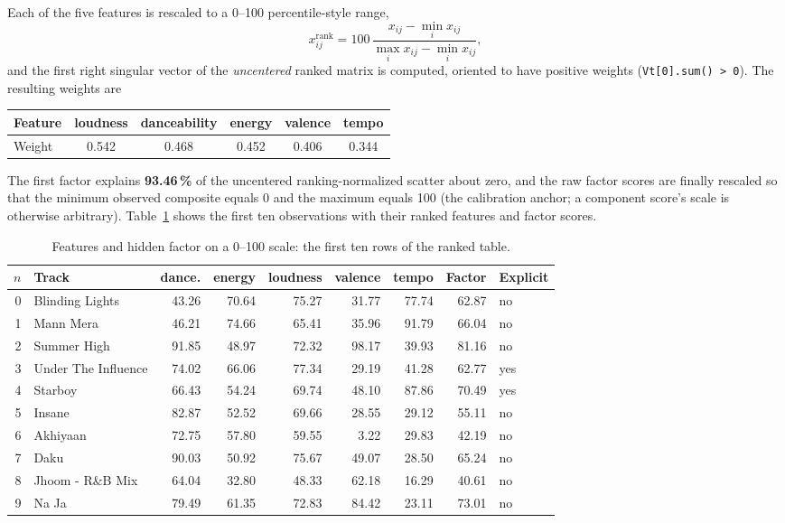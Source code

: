 \documentclass[11pt,letterpaper]{article}
\begin{document}
Each of the five features is rescaled to a 0--100 percentile-style range,
\begin{equation*}
  x^{\mathrm{rank}}_{ij}
  = 100\,\frac{x_{ij}-\min_i x_{ij}}{\max_i x_{ij}-\min_i x_{ij}},
\end{equation*}
and the first right singular vector of the \emph{uncentered} ranked
matrix is computed, oriented to have positive weights (\texttt{Vt[0].sum() >
0}). The resulting weights are
\begin{center}
\small
\begin{tabular}{lccccc}
\toprule
Feature & loudness & danceability & energy & valence & tempo \\
\midrule
Weight & 0.542 & 0.468 & 0.452 & 0.406 & 0.344 \\
\bottomrule
\end{tabular}
\end{center}
The first factor explains \textbf{93.46\,\%} of the uncentered
ranking-normalized scatter about zero, and the raw factor scores are finally
rescaled so that the minimum observed composite equals 0 and the maximum
equals 100 (the calibration anchor; a component score's scale is otherwise
arbitrary). Table~\ref{tab:a2ranktop} shows the first ten observations with
their ranked features and factor scores.

\begin{table}[H]
\centering
\caption{Features and hidden factor on a 0--100 scale: the first ten rows of
the ranked table.}
\label{tab:a2ranktop}
\footnotesize
\setlength{\tabcolsep}{4.5pt}
\begin{tabular}{rlrrrrrrl}
\toprule
$n$ & Track & dance. & energy & loudness & valence & tempo & Factor & Explicit \\
\midrule
0 & Blinding Lights       & 43.26 & 70.64 & 75.27 & 31.77 & 77.74 & 62.87 & no \\
1 & Mann Mera             & 46.21 & 74.66 & 65.41 & 35.96 & 91.79 & 66.04 & no \\
2 & Summer High           & 91.85 & 48.97 & 72.32 & 98.17 & 39.93 & 81.16 & no \\
3 & Under The Influence   & 74.02 & 66.06 & 77.34 & 29.19 & 41.28 & 62.77 & yes \\
4 & Starboy               & 66.43 & 54.24 & 69.74 & 48.10 & 87.86 & 70.49 & yes \\
5 & Insane                & 82.87 & 52.52 & 69.66 & 28.55 & 29.12 & 55.11 & no \\
6 & Akhiyaan              & 72.75 & 57.80 & 59.55 &  3.22 & 29.83 & 42.19 & no \\
7 & Daku                  & 90.03 & 50.92 & 75.67 & 49.07 & 28.50 & 65.24 & no \\
8 & Jhoom - R\&B Mix      & 64.04 & 32.80 & 48.33 & 62.18 & 16.29 & 40.61 & no \\
9 & Na Ja                 & 79.49 & 61.35 & 72.83 & 84.42 & 23.11 & 73.01 & no \\
\bottomrule
\end{tabular}
\end{table}
\end{document}
